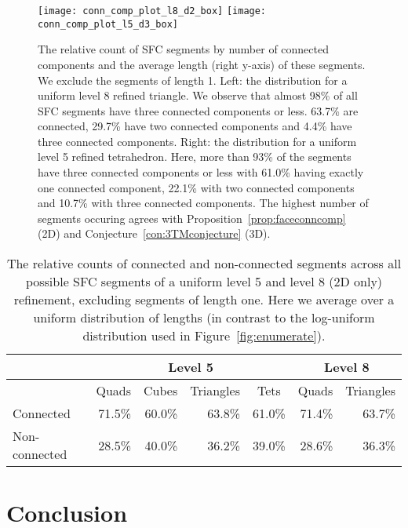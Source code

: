 \documentclass[a4paper,11pt]{article}
\newcommand{\figref}[1]{Figure~\ref{fig:#1}}
\newcommand{\seclab}[1]{\label{sec:#1}}
\begin{document}
\begin{figure}
        \begin{center}
\texttt{[image: conn\_comp\_plot\_l8\_d2\_box]}
\hfill
\texttt{[image: conn\_comp\_plot\_l5\_d3\_box]}
        \end{center}
\caption{The relative count of SFC segments by number of connected components and
the average length (right y-axis) of these segments.
We exclude the segments of length 1.
Left: the distribution for a uniform level 8 refined triangle. We observe that
almost 98\% of all SFC segments have three connected components or less.
63.7\% are connected, 29.7\% have two connected components and 4.4\% have
three connected components.
Right: the distribution for a uniform level 5 refined tetrahedron.
Here, more than 93\% of the segments have three connected components or less with
61.0\% having exactly one connected component, 22.1\% with two connected 
components and 10.7\% with three connected components.
The
highest number of segments occuring agrees with
Proposition~\ref{prop:faceconncomp} (2D) and
Conjecture~\ref{con:3TMconjecture} (3D).}
\label{fig:tritetnumcomp}
\end{figure}

\begin{table}
        \begin{center}
\begin{tabular}{|l|r|r|r|r||r|r|}
\hline
&\multicolumn{4}{|c||}{Level 5} & \multicolumn{2}{c|}{Level 8}\\
\hline
& Quads & Cubes & Triangles &
\multicolumn{1}{c||}{Tets} & Quads & Triangles\\ \hline
Connected     &71.5\% & 60.0\% &63.8\% & 61.0\% &71.4\%&63.7\%\\
Non-connected &28.5\% & 40.0\% &36.2\% & 39.0\% &28.6\%&36.3\%\\
\hline
\end{tabular}
        \end{center}
\caption{The relative counts of connected and non-connected segments across all
possible SFC segments of a uniform level 5 and level 8 (2D only) refinement,
excluding segments of length one.
Here we average over a uniform distribution of lengths (in contrast to
the log-uniform distribution used in \figref{enumerate}).}
\label{tab:componentpercent}
\end{table}



\section{Conclusion}
\seclab{conclusion}
\end{document}
